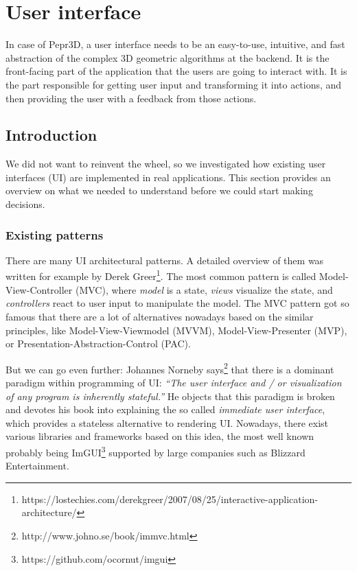 \chapter{User interface}

In case of Pepr3D, a user interface needs to be an easy-to-use, intuitive, and fast abstraction of the complex 3D geometric algorithms at the backend.
It is the front-facing part of the application that the users are going to interact with.
It is the part responsible for getting user input and transforming it into actions, and then providing the user with a feedback from those actions.

\section{Introduction}

We did not want to reinvent the wheel, so we investigated how existing user interfaces (UI) are implemented in real applications.
This section provides an overview on what we needed to understand before we could start making decisions.

\subsection{Existing patterns}

There are many UI architectural patterns.
A detailed overview of them was written for example by Derek Greer\footnote{https://lostechies.com/derekgreer/2007/08/25/interactive-application-architecture/}.
The most common pattern is called Model-View-Controller (MVC), where \emph{model} is a state, \emph{views} visualize the state, and \emph{controllers} react to user input to manipulate the model.
The MVC pattern got so famous that there are a lot of alternatives nowadays based on the similar principles, like Model-View-Viewmodel (MVVM), Model-View-Presenter (MVP), or Presentation-Abstraction-Control (PAC).

But we can go even further: Johannes Norneby says\footnote{http://www.johno.se/book/immvc.html} that there is a dominant paradigm within programming of UI: \emph{``The user interface and / or visualization of any program is inherently stateful.''}
He objects that this paradigm is broken and devotes his book into explaining the so called \emph{immediate user interface}, which provides a stateless alternative to rendering UI.
Nowadays, there exist various libraries and frameworks based on this idea, the most well known probably being ImGUI\footnote{https://github.com/ocornut/imgui} supported by large companies such as Blizzard Entertainment.

